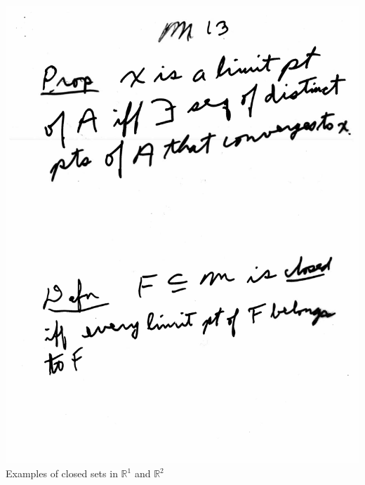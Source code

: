 \documentclass[10pt,a4paper]{article}
\begin{document}
{{\begin{flushleft}
\includegraphics[scale=.5]{Pages/MS_13}
\newpage
Examples of closed sets in $\mathbb{R}^1$ and $\mathbb{R}^2$


\end{flushleft}}}
\end{document}
